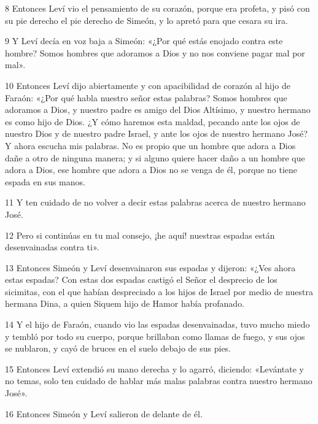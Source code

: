 \par 8 Entonces Leví vio el pensamiento de su corazón, porque era profeta, y pisó con su pie derecho el pie derecho de Simeón, y lo apretó para que cesara su ira.

\par 9 Y Leví decía en voz baja a Simeón: «¿Por qué estás enojado contra este hombre? Somos hombres que adoramos a Dios y no nos conviene pagar mal por mal».

\par 10 Entonces Leví dijo abiertamente y con apacibilidad de corazón al hijo de Faraón: «¿Por qué habla nuestro señor estas palabras? Somos hombres que adoramos a Dios, y nuestro padre es amigo del Dios Altísimo, y nuestro hermano es como hijo de Dios. ¿Y cómo haremos esta maldad, pecando ante los ojos de nuestro Dios y de nuestro padre Israel, y ante los ojos de nuestro hermano José? Y ahora escucha mis palabras. No es propio que un hombre que adora a Dios dañe a otro de ninguna manera; y si alguno quiere hacer daño a un hombre que adora a Dios, ese hombre que adora a Dios no se venga de él, porque no tiene espada en sus manos.

\par 11 Y ten cuidado de no volver a decir estas palabras acerca de nuestro hermano José.

\par 12 Pero si continúas en tu mal consejo, ¡he aquí! nuestras espadas están desenvainadas contra ti».

\par 13 Entonces Simeón y Leví desenvainaron sus espadas y dijeron: «¿Ves ahora estas espadas? Con estas dos espadas castigó el Señor el desprecio de los sicimitas, con el que habían despreciado a los hijos de Israel por medio de nuestra hermana Dina, a quien Siquem hijo de Hamor había profanado.

\par 14 Y el hijo de Faraón, cuando vio las espadas desenvainadas, tuvo mucho miedo y tembló por todo su cuerpo, porque brillaban como llamas de fuego, y sus ojos se nublaron, y cayó de bruces en el suelo debajo de sus pies.

\par 15 Entonces Leví extendió su mano derecha y lo agarró, diciendo: «Levántate y no temas, solo ten cuidado de hablar más malas palabras contra nuestro hermano José».

\par 16 Entonces Simeón y Leví salieron de delante de él.


